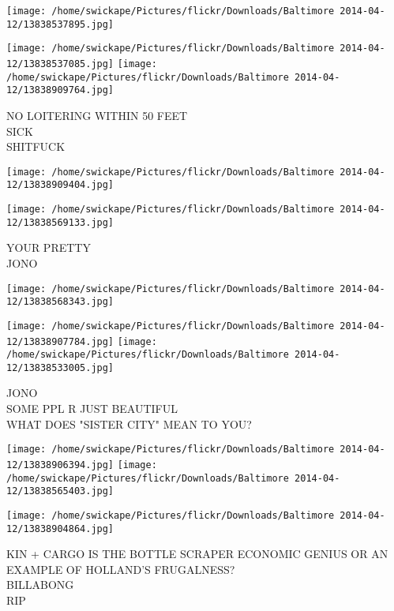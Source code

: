 \documentclass[10pt,letterpaper]{article}
\begin{document}
\texttt{[image: /home/swickape/Pictures/flickr/Downloads/Baltimore 2014-04-12/13838537895.jpg]}

\vspace{0.25in}
\texttt{[image: /home/swickape/Pictures/flickr/Downloads/Baltimore 2014-04-12/13838537085.jpg]}
\texttt{[image: /home/swickape/Pictures/flickr/Downloads/Baltimore 2014-04-12/13838909764.jpg]}

NO LOITERING WITHIN 50 FEET\\
SICK\\
SHITFUCK\\
\pagebreak

\texttt{[image: /home/swickape/Pictures/flickr/Downloads/Baltimore 2014-04-12/13838909404.jpg]}

\vspace{0.25in}
\texttt{[image: /home/swickape/Pictures/flickr/Downloads/Baltimore 2014-04-12/13838569133.jpg]}

YOUR PRETTY\\
JONO\\
\pagebreak

\texttt{[image: /home/swickape/Pictures/flickr/Downloads/Baltimore 2014-04-12/13838568343.jpg]}

\vspace{0.25in}
\texttt{[image: /home/swickape/Pictures/flickr/Downloads/Baltimore 2014-04-12/13838907784.jpg]}
\texttt{[image: /home/swickape/Pictures/flickr/Downloads/Baltimore 2014-04-12/13838533005.jpg]}

JONO\\
SOME PPL R JUST BEAUTIFUL\\
WHAT DOES "SISTER CITY" MEAN TO YOU?\\
\pagebreak

\texttt{[image: /home/swickape/Pictures/flickr/Downloads/Baltimore 2014-04-12/13838906394.jpg]}
\texttt{[image: /home/swickape/Pictures/flickr/Downloads/Baltimore 2014-04-12/13838565403.jpg]}

\texttt{[image: /home/swickape/Pictures/flickr/Downloads/Baltimore 2014-04-12/13838904864.jpg]}

KIN + CARGO IS THE BOTTLE SCRAPER ECONOMIC GENIUS OR AN EXAMPLE OF HOLLAND'S FRUGALNESS?\\
BILLABONG\\
RIP\\
\pagebreak
\end{document}
